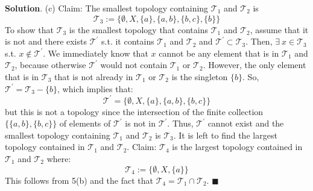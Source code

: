 \documentclass[12pt]{article}
\renewcommand{\=}[1]{\stackrel{#1}{=}} %
\providecommand{\T}{\mathcal{T}}
\theoremstyle{definition}
\newenvironment{s}{%
        \begin{trivlist} \item \textbf{Solution}. }{%
            \hspace*{\fill} $\blacksquare$\end{trivlist}}%
\begin{document}
\begin{s}
    (c) Claim: The smallest topology containing $\T_1$ and $\T_2$ is 
    \[ \T_3 := \{\emptyset, X, \{a\}, \{a,b\}, \{b,c\}, \{b\} \}  \]
    To show that $\T_3$ is the smallest topology that contains $\T_1$ and $\T_2$, assume that it is not and there exists
    $\T^{'}$ s.t. it contains $\T_1$ and $\T_2$ and $\T^{'}\subset\T_3$. Then, $\exists\:x\in\T_3$ s.t. $x\not\in\T^{'}$.
    We immediately know that $x$ cannot be any element that is in $\T_1$ and $\T_2$, because otherwise $\T^{'}$ would
    not contain $\T_1$ or $\T_2$. However, the only element that is in $\T_3$ that is not already in $\T_1$ or $\T_2$
    is the singleton $\{b\}$. So, $\T^{'} = \T_3 - \{b\}$, which implies that:
    \[ \T^{'} = \{\emptyset, X, \{a\}, \{a,b\}, \{b,c\} \} \]
    but this is not a topology since the intersection of the finite collection $\{\{a,b\},\{b,c\}\}$ of elements
    of $\T^{'}$ is not in $\T^{'}$. Thus, $\T^{'}$ cannot exist and the smallest topology containing $\T_1$ and $\T_2$
    is $\T_3$. It is left to find the largest topology contained in $\T_1$ and $\T_2$. Claim: $\T_4$ is the largest
    topology contained in $\T_1$ and $\T_2$ where:
    \[ \T_4 := \{\emptyset, X, \{a\}\} \]
    This follows from 5(b) and the fact that $\T_4 = \T_1 \cap \T_2$.
\end{s}
\end{document}

